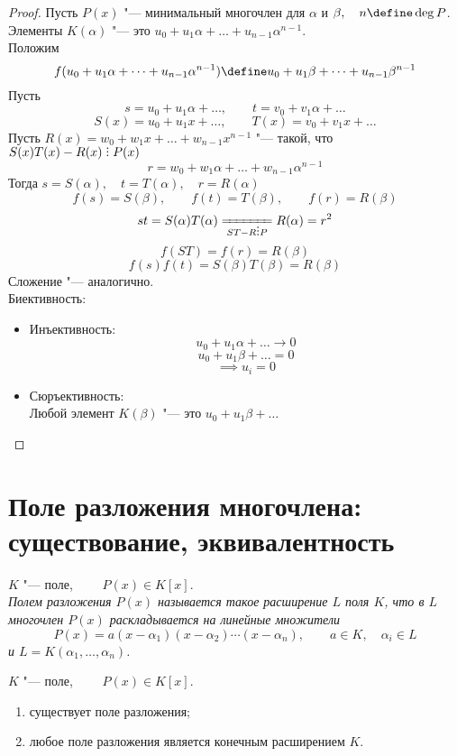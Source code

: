 \begin{proof}
	Пусть $ P(x) $ "--- минимальный многочлен для $ \alpha $ и $ \beta, \quad n \define \deg P $. \\
	Элементы $ K(\alpha) $ "--- это $ u_0 + u_1\alpha + \dots + u_{n - 1}\alpha^{n - 1} $. \\
	Положим
	$$ f(u_0 + u_1 \alpha + \dots + u_{n - 1}\alpha^{n - 1}) \define u_0 + u_1\beta + \dots + u_{n - 1}\beta^{n - 1} $$
	Пусть
	$$ s = u_0 + u_1\alpha + \dots, \qquad t = v_0 + v_1\alpha + \dots $$
	$$ S(x) = u_0 + u_1 x + \dots, \qquad T(x) = v_0 + v_1x + \dots $$
	Пусть $ R(x) = w_0 + w_1x + \dots + w_{n - 1}x^{n - 1} $ "--- такой, что $ S(x)T(x) - R(x) \divby P(x) $
	$$ r = w_0 + w_1\alpha + \dots + w_{n - 1}\alpha^{n - 1} $$
	Тогда $ s = S(\alpha), \quad t = T(\alpha), \quad r = R(\alpha) $
	$$ f(s) = S(\beta), \qquad f(t) = T(\beta), \qquad f(r) = R(\beta) $$
	$$ st = S(\alpha) T(\alpha) \undereq{ST - R \divby P} R(\alpha) = r^2 $$
	$$ f(ST) = f(r) = R(\beta) $$
	$$ f(s)f(t) = S(\beta)T(\beta) = R(\beta) $$
	Сложение "--- аналогично. \\
	Биективность:
	\begin{itemize}
		\item Инъективность:
		$$ u_0 + u_1\alpha + \dots \to 0 $$
		$$ u_0 + u_1\beta + \dots = 0 $$
		$$ \implies u_i = 0 $$
		\item Сюръективность: \\
		Любой элемент $ K(\beta) $ "--- это $ u_0 + u_1\beta + \dots $
	\end{itemize}
\end{proof}

\section{Поле разложения многочлена: существование, эквивалентность}

\begin{definition}
	$ K $ "--- поле, $ \qquad P(x) \in K[x] $. \\
	\it{Полем разложения} $ P(x) $ называется такое расширение $ L $ поля $ K $, что в $ L $ многочлен $ P(x) $ раскладывается на линейные множители
	$$ P(x) = a(x - \alpha_1)(x - \alpha_2) \cdots (x - \alpha_n), \qquad a \in K, \quad \alpha_i \in L $$
	и $ L = K(\alpha_1, \dots, \alpha_n) $.
\end{definition}

\begin{theorem}
	$ K $ "--- поле, $ \qquad P(x) \in K[x] $.
	\begin{enumerate}
		\item существует поле разложения;
		\item любое поле разложения является конечным расширением $ K $.
	\end{enumerate}
\end{theorem}

